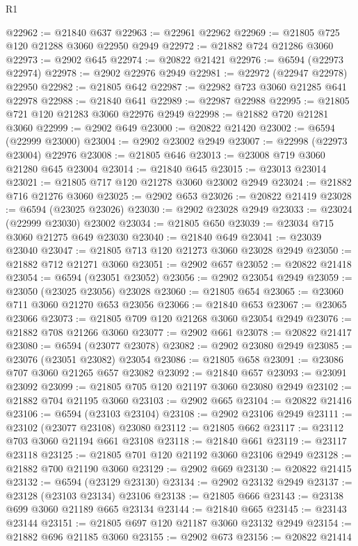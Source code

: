 \begin{lexlean}{R1}
\begin{coremodule}
@22962 := @21840 @637
@22963 := @22961 @22962
@22969 := @21805 @725 @120 @21288 @3060 @22950 @2949
@22972 := @21882 @724 @21286 @3060
@22973 := @2902 @645
@22974 := @20822 @21421
@22976 := @6594 (@22973 @22974)
@22978 := @2902 @22976 @2949
@22981 := @22972 (@22947 @22978) @22950
@22982 := @21805 @642
@22987 := @22982 @723 @3060 @21285 @641 @22978
@22988 := @21840 @641
@22989 := @22987 @22988
@22995 := @21805 @721 @120 @21283 @3060 @22976 @2949
@22998 := @21882 @720 @21281 @3060
@22999 := @2902 @649
@23000 := @20822 @21420
@23002 := @6594 (@22999 @23000)
@23004 := @2902 @23002 @2949
@23007 := @22998 (@22973 @23004) @22976
@23008 := @21805 @646
@23013 := @23008 @719 @3060 @21280 @645 @23004
@23014 := @21840 @645
@23015 := @23013 @23014
@23021 := @21805 @717 @120 @21278 @3060 @23002 @2949
@23024 := @21882 @716 @21276 @3060
@23025 := @2902 @653
@23026 := @20822 @21419
@23028 := @6594 (@23025 @23026)
@23030 := @2902 @23028 @2949
@23033 := @23024 (@22999 @23030) @23002
@23034 := @21805 @650
@23039 := @23034 @715 @3060 @21275 @649 @23030
@23040 := @21840 @649
@23041 := @23039 @23040
@23047 := @21805 @713 @120 @21273 @3060 @23028 @2949
@23050 := @21882 @712 @21271 @3060
@23051 := @2902 @657
@23052 := @20822 @21418
@23054 := @6594 (@23051 @23052)
@23056 := @2902 @23054 @2949
@23059 := @23050 (@23025 @23056) @23028
@23060 := @21805 @654
@23065 := @23060 @711 @3060 @21270 @653 @23056
@23066 := @21840 @653
@23067 := @23065 @23066
@23073 := @21805 @709 @120 @21268 @3060 @23054 @2949
@23076 := @21882 @708 @21266 @3060
@23077 := @2902 @661
@23078 := @20822 @21417
@23080 := @6594 (@23077 @23078)
@23082 := @2902 @23080 @2949
@23085 := @23076 (@23051 @23082) @23054
@23086 := @21805 @658
@23091 := @23086 @707 @3060 @21265 @657 @23082
@23092 := @21840 @657
@23093 := @23091 @23092
@23099 := @21805 @705 @120 @21197 @3060 @23080 @2949
@23102 := @21882 @704 @21195 @3060
@23103 := @2902 @665
@23104 := @20822 @21416
@23106 := @6594 (@23103 @23104)
@23108 := @2902 @23106 @2949
@23111 := @23102 (@23077 @23108) @23080
@23112 := @21805 @662
@23117 := @23112 @703 @3060 @21194 @661 @23108
@23118 := @21840 @661
@23119 := @23117 @23118
@23125 := @21805 @701 @120 @21192 @3060 @23106 @2949
@23128 := @21882 @700 @21190 @3060
@23129 := @2902 @669
@23130 := @20822 @21415
@23132 := @6594 (@23129 @23130)
@23134 := @2902 @23132 @2949
@23137 := @23128 (@23103 @23134) @23106
@23138 := @21805 @666
@23143 := @23138 @699 @3060 @21189 @665 @23134
@23144 := @21840 @665
@23145 := @23143 @23144
@23151 := @21805 @697 @120 @21187 @3060 @23132 @2949
@23154 := @21882 @696 @21185 @3060
@23155 := @2902 @673
@23156 := @20822 @21414

\end{coremodule}
\end{lexlean}
